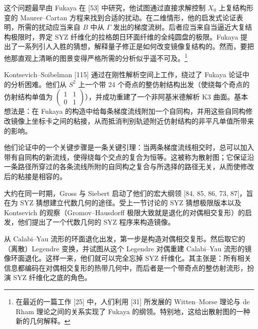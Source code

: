 这个问题最早由 Fukaya 在 [53] 中研究，他试图通过直接求解控制 $X_0$ 上复结构形变的 Maurer--Cartan 方程来找到合适的扰动。在二维情形，他的启发式论证表明，所需的扰动应当来自 $B$ 中从 $\Gamma$ 发出的梯度流树。后者应当来自当逼近大复结构极限时，界定 SYZ 纤维化的拉格朗日环面纤维的全纯圆盘的极限。Fukaya 提出了一系列引人入胜的猜想，解释量子修正是如何改变镜像复结构的。然而，要把他那直观上清晰的图景变得严格所需的分析似乎遥不可及。\footnote{在最近的一篇工作 [25] 中，人们利用 [31] 所发展的 Witten--Morse 理论与 de Rham 理论之间的关系实现了 Fukaya 的纲领。特别地，这给出散射图的一种新的几何解释。}

Kontsevich--Soibelman [115] 通过在刚性解析空间上工作，绕过了 Fukaya 论证中的分析困难。他们从 $S^2$ 上一个带 24 个奇点的整仿射结构出发（使绕每个奇点的仿射结构单值为 $\begin{pmatrix}1&1\\0&1\end{pmatrix}$），并成功重建了一个非阿基米德解析 K3 曲面。基本想法是：在 Fukaya 的构造中给每条梯度流线附加一个自同构，并用这些自同构修改镜像上坐标卡之间的粘接，从而抵消判别轨迹附近仿射结构的非平凡单值所带来的影响。

他们论证中的一个关键步骤是一条关键引理：当两条梯度流线相交时，总可以加入带有自同构的新流线，使得绕每个交点的复合为恒等。这被称为散射图；它保证沿一条路径所穿过的各条流线所附的自同构之复合与所选择的路径无关，从而使修改后的粘接是相容的。

大约在同一时期，Gross 与 Siebert 启动了他们的宏大纲领 [84, 85, 86, 73, 87]，旨在为 SYZ 猜想建立代数几何的途径。受上一节讨论的 SYZ 猜想极限版本以及 Kontsevich 的观察（Gromov--Hausdorff 极限大致就是退化的对偶相交复形）的启发，他们提出了一个代数几何的 SYZ 程序来构造镜像。

从 Calabi--Yau 流形的环面退化出发，第一步是构造对偶相交复形。然后取它的（离散）Legendre 变换，并试图从这个 Legendre 对偶重建 Calabi--Yau 流形的镜像环面退化。这样一来，他们就可以完全忘掉 SYZ 纤维化。其主张是：所有相关信息都编码在对偶相交复形的热带几何中，而后者是一个带奇点的整仿射流形，扮演 SYZ 纤维化之底的角色。

